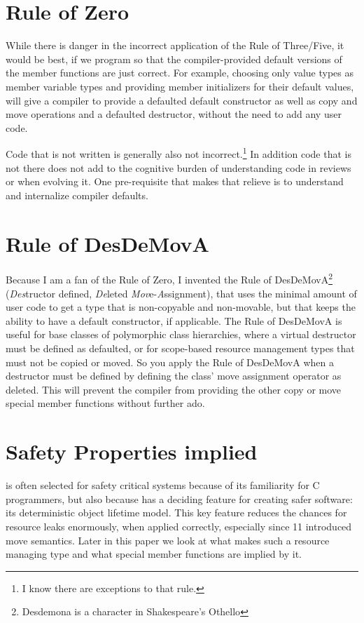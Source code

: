 \documentclass[ebook,11pt,article]{memoir}
\begin{document}
\section{Rule of Zero}
While there is danger in the incorrect application of the Rule of Three/Five, it would be best, if we program so that the compiler-provided default versions of the member functions are just correct\cite{RoZero}.
For example, choosing only value types as member variable types and providing member initializers for their default values, will give a compiler to provide a defaulted default constructor as well as copy and move operations and a defaulted destructor, without the need to add any user code.

Code that is not written is generally also not incorrect.\footnote{I know there are exceptions to that rule.}
In addition code that is not there does not add to the cognitive burden of understanding code in reviews or when evolving it. One pre-requisite that makes that relieve is to understand and internalize compiler defaults.

\section{Rule of DesDeMovA}
Because I am a fan of the Rule of Zero, I invented the Rule of DesDeMovA\cite{RoDesDeMovA}\footnote{Desdemona is a character in Shakespeare's Othello} (\emph{Des}tructor defined, \emph{De}leted \emph{Mov}e-\emph{A}ssignment), that uses the minimal amount of user code to get a type that is non-copyable and non-movable, but that keeps the ability to have a default constructor, if applicable. The Rule of DesDeMovA is useful for base classes of polymorphic class hierarchies, where a virtual destructor must be defined as defaulted, or for scope-based resource management types that must not be copied or moved. So you apply the Rule of DesDeMovA when a destructor must be defined by defining the class' move assignment operator as deleted. This will prevent the compiler from providing the other copy or move special member functions without further ado.

\section{Safety Properties implied}
\Cpp{} is often selected for safety critical systems because of its familiarity for C programmers, but also because \Cpp{} has a deciding feature for creating safer software: its deterministic object lifetime model. This key feature reduces the chances for resource leaks enormously, when applied correctly, especially since \Cpp{}11 introduced move semantics. Later in this paper we look at what makes such a resource managing type and what special member functions are implied by it.
\end{document}
